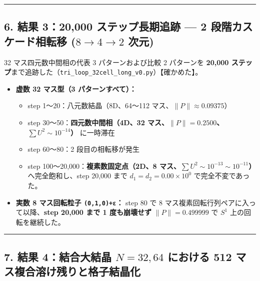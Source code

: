\documentclass[
  a4paper,
]{ltjsarticle}
\providecommand{\tightlist}{%
  \setlength{\itemsep}{0pt}\setlength{\parskip}{0pt}}
\begin{document}
\begin{center}\rule{0.5\linewidth}{0.5pt}\end{center}

\subsection{\texorpdfstring{6. 結果 3：20,000 ステップ長期追跡 --- 2
段階カスケード相転移 (\(8 \to 4 \to 2\)
次元)}{6. 結果 3：20,000 ステップ長期追跡 --- 2 段階カスケード相転移 (8 \textbackslash to 4 \textbackslash to 2 次元)}}\label{ux7d50ux679c-320000-ux30b9ux30c6ux30c3ux30d7ux9577ux671fux8ffdux8de1-2-ux6bb5ux968eux30abux30b9ux30b1ux30fcux30c9ux76f8ux8ee2ux79fb-8-to-4-to-2-ux6b21ux5143}

32 マス四元数中間相の代表 3 パターンおよび比較 2 パターンを
\textbf{20,000
ステップ}まで追跡した（\texttt{tri\_\allowbreak{}loop\_\allowbreak{}32cell\_\allowbreak{}long\_\allowbreak{}v0.py}）【確かめた】。

\begin{itemize}
\tightlist
\item
  \textbf{虚数 32 マス型（3 パターンすべて）：}

  \begin{itemize}
  \tightlist
  \item
    step 1〜20：八元数結晶（8D、64〜112
    マス、\(\|P\| \approx 0.09375\)）
  \item
    step 30〜50：\textbf{四元数中間相（4D、32
    マス、\(\|P\| = 0.2500\)、\(\sum U^2 \sim 10^{-14}\)）} に一時滞在
  \item
    step 60〜80：2 段目の相転移が発生
  \item
    step 100〜20,000：\textbf{複素数固定点（2D、8
    マス、\(\sum U^2 \sim 10^{-13} \sim 10^{-11}\)）} へ完全飽和し、step
    20,000 まで \(d_1 = d_2 = 0.00 \times 10^0\) で完全不変であった。
  \end{itemize}
\item
  \textbf{実数 8 マス回転粒子 \texttt{(0,1,0)+ε}：} step 80 で 8
  マス複素回転行列ペアに入って以降、\textbf{step 20,000 まで 1
  度も崩壊せず} \(\|P\| = 0.499999\) で \(S^1\) 上の回転を継続した。
\end{itemize}

\begin{center}\rule{0.5\linewidth}{0.5pt}\end{center}

\subsection{\texorpdfstring{7. 結果 4：結合大結晶 \(N = 32, 64\)
における 512
マス複合溶け残りと格子結晶化}{7. 結果 4：結合大結晶 N = 32, 64 における 512 マス複合溶け残りと格子結晶化}}\label{ux7d50ux679c-4ux7d50ux5408ux5927ux7d50ux6676-n-32-64-ux306bux304aux3051ux308b-512-ux30deux30b9ux8907ux5408ux6eb6ux3051ux6b8bux308aux3068ux683cux5b50ux7d50ux6676ux5316}
\end{document}
